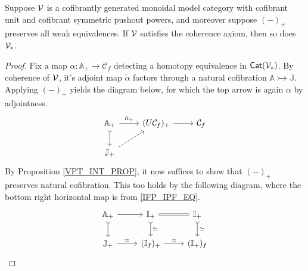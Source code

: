 \documentclass[a4paper,10pt
,draft
]{article}%
\newcommand{\I}{\mathbb I}
\newcommand{\J}{\mathbb J}
\renewcommand{\1}{\eta}%
\begin{document}
\begin{proposition}
      \label{PT_COH_PROP}
      Suppose $\mathcal V$ is a cofibrantly generated monoidal model category with cofibrant unit and cofibrant symmetric pushout powers,
      and moreover suppose $(-)_+$ preserves all weak equivalences.
      If $\mathcal V$ satisfies the coherence axiom, then so does $\V_{\**}$.
\end{proposition}
\begin{proof}
      Fix a map $\alpha:\mathbb A_+ \to \mathcal C_f$ detecting a homotopy equivalence in $\Cat(\V_{\**})$.
      By coherence of $\mathcal V$, it's adjoint map $\tilde \alpha$
      factors through a natural cofibration $\mathbb A \rightarrowtail \J$.
      Applying $(-)_+$ yields the diagram below, for which the top arrow is again $\alpha$ by adjointness.
      \begin{equation}
            \begin{tikzcd}
                  \mathbb A_+ \arrow[d, rightarrowtail] \arrow[r, "\tilde{\alpha}_+"]
                  &
                  (U \mathcal C_f)_+ \arrow[r]
                  &
                  \mathcal C_f
                  \\
                  \J_+ \arrow[ur, dashed]
            \end{tikzcd}
      \end{equation}
      By Proposition \ref{VPT_INT_PROP}, it now suffices to show that $(-)_+$ preserves natural cofibration.
      This too holds by the following diagram, where the bottom right horizontal map is from \eqref{IFP_IPF_EQ}.
      \begin{equation}
            \begin{tikzcd}
                  \mathbb A_+ \arrow[d, rightarrowtail] \arrow[r]
                  &
                  \I_+ \arrow[d, rightarrowtail, "\simeq"] \arrow[r, equal]
                  &
                  \I_+ \arrow[d, rightarrowtail, "\simeq"]
                  \\
                  \J_+ \arrow[r, "\simeq"]
                  &
                  (\I_f)_+ \arrow[r, "\simeq"]
                  &
                  (\I_+)_f
            \end{tikzcd}
      \end{equation}
\end{proof}
\end{document}

